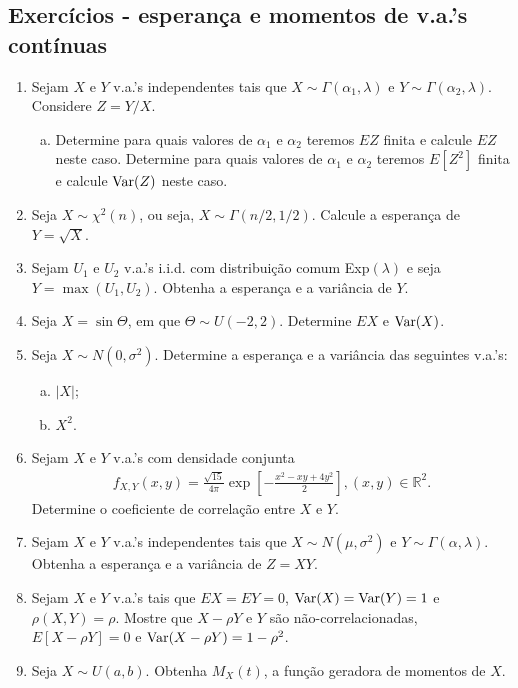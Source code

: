 \documentclass[../Notas.tex]{subfiles}
\begin{document}
\subsection{Exercícios - esperança e momentos de v.a.'s contínuas}

\begin{enumerate}
    \item Sejam $X$ e $Y$ v.a.’s independentes tais que $X\sim\Gamma(\alpha_1,\lambda)$ e $Y\sim\Gamma(\alpha_2,\lambda)$. Considere $Z = Y/X$.
    \begin{enumerate}[a)]
    \item Determine para quais valores de $\alpha_1$ e $\alpha_ 2$ teremos $EZ$ finita e calcule $EZ$ neste caso.
    Determine para quais valores de $\alpha_1$ e $\alpha_2$ teremos $E[Z^2]$ finita e calcule $\text{Var}(Z)$ neste caso.
    \end{enumerate}
    \item Seja $X\sim\chi^2(n)$, ou seja, $X\sim\Gamma(n/2,1/2)$. Calcule a esperança de $Y = \sqrt{X}$.
    \item Sejam $U_1$ e $U_2$ v.a.’s i.i.d. com distribuição comum Exp$(\lambda)$ e seja $Y = \max(U_1,U_2)$. Obtenha a esperança e a variância de $Y$.
    \item Seja $X = \sin\Theta$, em que $\Theta\sim U(-2,2)$. Determine $EX$ e $\text{Var}(X)$.
    \item Seja $X\sim N(0, \sigma^2)$. Determine a esperança e a variância das seguintes v.a.’s:
    \begin{enumerate}[a)]
    \item $|X|$;
    \item $X^2$.
    \end{enumerate}
    \item Sejam $X$ e $Y$ v.a.’s com densidade conjunta
    \begin{align*}
        f_{X,Y}(x,y) = \frac{\sqrt{15}}{4\pi}\exp[ -\frac{x^2 - xy + 4y^2}{2} ], (x,y)\in\mathbb{R}^2.
    \end{align*}
    Determine o coeficiente de correlação entre $X$ e $Y$.
    \item Sejam $X$ e $Y$ v.a.’s independentes tais que $X\sim N(\mu, \sigma^2)$ e $Y\sim\Gamma(\alpha,\lambda)$. Obtenha a esperança e a variância de $Z = XY$.
    \item Sejam $X$ e $Y$ v.a.’s tais que $EX = EY = 0$, $\text{Var}(X) = \text{Var}(Y) = 1$ e $\rho(X, Y) = \rho$. Mostre que $X - \rho Y$ e $Y$ são não-correlacionadas, $E[X - \rho Y] = 0$ e $\text{Var}(X - \rho Y) = 1 - \rho^2$.
    \item Seja $X\sim U(a,b)$. Obtenha $M_X(t)$, a função geradora de momentos de $X$.

\end{enumerate}
\end{document}
